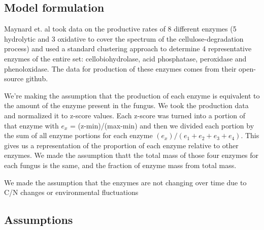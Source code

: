 \documentclass[12pt]{article}
\begin{document}
\begin{multicols}{2}
\section{Model formulation}
Maynard et. al took data on the productive rates of 8 different enzymes (5 hydrolytic and 3 oxidative to cover the spectrum of the cellulose-degradation process) and used a standard clustering approach to determine 4 representative enzymes of the entire set: cellobiohydrolase, acid phosphatase, peroxidase and phenoloxidase. The data for production of these enzymes comes from their open-source github. 

We're making the assumption that the production of each enzyme is  equivalent to the amount of the enzyme present in the fungus. We took the production data and normalized it to z-score values. Each z-score was turned into a portion of that enzyme with $e_x$ = (z-min)/(max-min) and then we divided each portion by the sum of all enzyme portions for each enzyme $(e_x)/(e_1+e_2+e_3+e_4)$. This gives us a representation of the proportion of each enzyme relative to other enzymes. We made the assumption thatt the total mass of those four enzymes for each fungus is the same, and the fraction of enzyme mass from total mass.

We made the assumption that the enzymes are not changing over time due to C/N changes or environmental fluctuations

\subsection{Assumptions}


\end{multicols}
\end{document}
